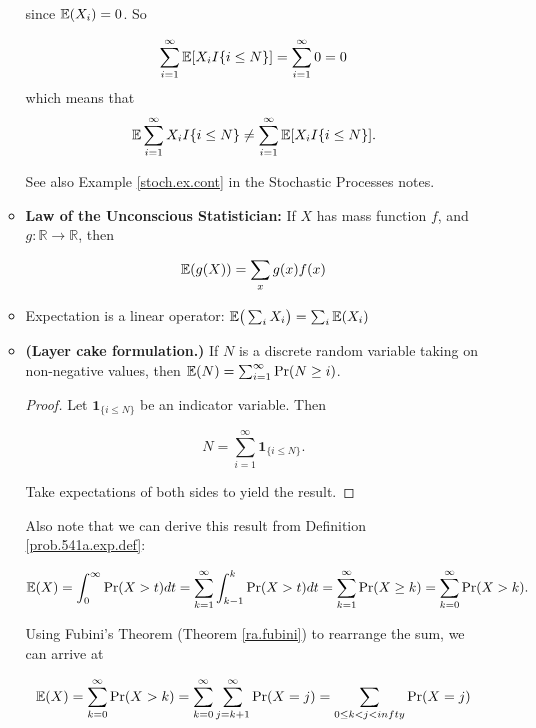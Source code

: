 \begin{itemize}
\begin{itemize}
\begin{example}
since \(\mathbb{E}(X_i) = 0\). So

\[
 \sum_{i=1}^\infty  \mathbb{E} [ X_i I\{i \leq N\}] =  \sum_{i=1}^\infty  0 = 0
 \]
which means that 
\[
 \mathbb{E} \sum_{i=1}^\infty X_i I\{i \leq N\} \neq  \sum_{i=1}^\infty  \mathbb{E} [ X_i I\{i \leq N\}].
 \]
 
 See also Example \ref{stoch.ex.cont} in the Stochastic Processes notes.

\end{example}

\item \begin{theorem} \label{prob.law.of.uncon} \textbf{Law of the Unconscious Statistician:} If \(X\) has mass function \(f\), and \(g: \mathbb{R} \to \mathbb{R}\), then 

\[
\mathbb{E}(g(X)) = \sum_x g(x) f(x)
\] \end{theorem}

\item \begin{theorem}Expectation is a linear operator: \( \mathbb{E} \big(\sum_i X_i \big) = \sum_i \mathbb{E}(X_i)\) \end{theorem}

\item \begin{theorem} \textbf{(Layer cake formulation.)} If \(N\) is a discrete random variable taking on non-negative values, then \(\mathbb{E}(N) = \sum_{i=1}^\infty \Pr(N \geq i)\).

\begin{proof} Let \(\boldsymbol{1}_{\{i \leq N\}}\) be an indicator variable. Then 

\[
N = \sum_{i=1}^\infty \boldsymbol{1}_{\{i \leq N\}}.
\]

Take expectations of both sides to yield the result.

\end{proof}

\begin{remark} Also note that we can derive this result from Definition \ref{prob.541a.exp.def}:

\[
\mathbb{E}(X) = \int_0^\infty \Pr(X > t) dt = \sum_{k=1}^\infty \int_{k-1}^k \Pr(X >t) dt = \sum_{k=1}^\infty \Pr(X \geq k) = \sum_{k=0}^\infty \Pr(X > k).
\]

Using Fubini's Theorem (Theorem \ref{ra.fubini}) to rearrange the sum, we can arrive at

\[
\mathbb{E}(X) = \sum_{k=0}^\infty \Pr(X > k) = \sum_{k=0}^\infty \sum_{j=k+1}^\infty \Pr(X=j) = \sum_{0 \leq k < j < infty} \Pr(X=j) 
\]


\end{remark}
\end{theorem}
\end{itemize}
\end{itemize}
